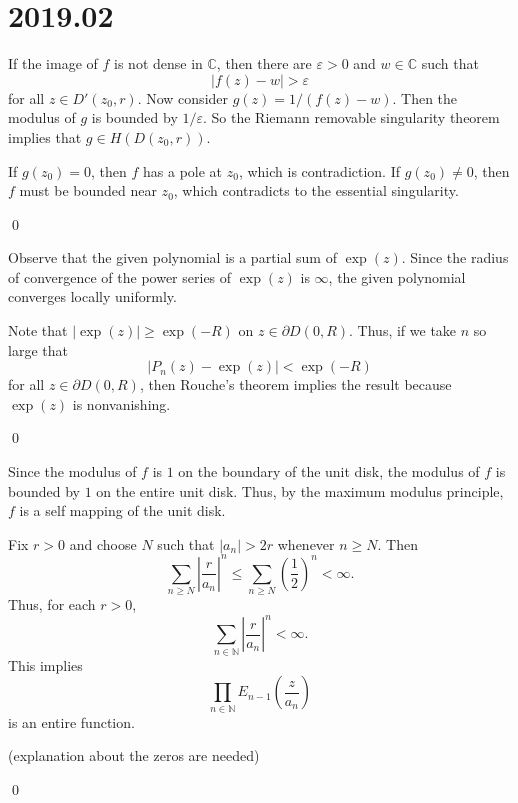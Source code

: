 \section{2019.02}
\begin{problem}

	If the image of $f$ is not dense in $\mathbb{C}$, then there are $\varepsilon >0$ and $w \in \mathbb{C}$ such that
	\[
		\lvert f(z) - w \lvert > \varepsilon
	\]
	for all $z \in D'(z_0, r)$.
	Now consider $g(z) = 1/(f(z) - w)$.
	Then the modulus of $g$ is bounded by $1/\varepsilon$.
	So the Riemann removable singularity theorem implies that $g \in H(D(z_0, r))$.

	If $g(z_0) = 0$, then $f$ has a pole at $z_0$, which is contradiction.
	If $g(z_0) \ne 0$, then $f$ must be bounded near $z_0$, which contradicts to the essential singularity.

	\qed
\end{problem}

\begin{problem}
	
	Observe that the given polynomial is a partial sum of $\exp(z)$.
	Since the radius of convergence of the power series of $\exp(z)$ is $\infty$,
	the given polynomial converges locally uniformly.

	Note that $ \lvert \exp(z) \lvert \geq \exp(-R)$ on $z \in \partial D(0, R)$.
	Thus, if we take $n$ so large that 
	\[
		\lvert P_n(z) - \exp(z) \lvert < \exp(-R)
	\]
	for all $z \in \partial D(0, R)$, then Rouche's theorem implies the result because $\exp(z)$ is nonvanishing.

	\qed
\end{problem}

\begin{problem}
	
	Since the modulus of $f$ is $1$ on the boundary of the unit disk, the modulus of $f$ is bounded by $1$ on the entire unit disk.
	Thus, by the maximum modulus principle, $f$ is a self mapping of the unit disk.
\end{problem}

\begin{problem}
	
	Fix $r>0$ and choose $N$ such that $\lvert a_n \lvert > 2r$ whenever $n \geq N$.
	Then
	\[
		\sum_{n\geq N} \left \lvert \frac{r}{a_n} \right \lvert ^n \leq \sum_{n\geq N} \left( \frac{1}{2} \right)^n < \infty.
	\]
	Thus, for each $r>0$,
	\[
		\sum_{n \in \mathbb{N}} \left \lvert \frac{r}{a_n} \right \lvert ^n < \infty.
	\]
	This implies
	\[
		\prod_{n \in \mathbb{N}} E_{n-1}\left( \frac{z}{a_n} \right)
	\]
	is an entire function.

	(explanation about the zeros are needed)

	\qed
\end{problem}

